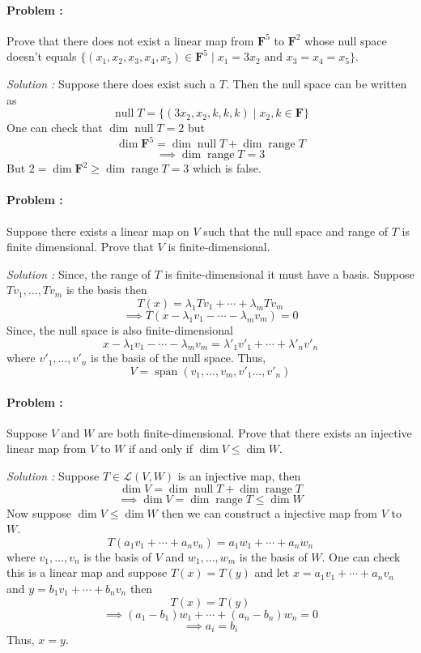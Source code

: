 \paragraph{Problem :} Prove that there does not exist a linear map from $\mathbf{F}^5$ to $\mathbf{F}^2$ whose null space doesn't 
equals $\{ (x_1, x_2, x_3, x_4, x_5) \in \mathbf{F}^5 \mid x_1 = 3x_2 \text{ and } x_3 = x_4 = x_5 \}$.

\vspace{4mm}
\textit{Solution :} Suppose there does exist such a $T$. Then the null space can be written as
\[ \operatorname{null} T = \{ (3x_2,x_2,k,k,k) \mid x_2, k \in \mathbf{F}\} \]
One can check that $\dim \operatorname{null} T = 2$ but 
\[ \dim \mathbf{F}^5 = \dim \operatorname{null} T + \dim \operatorname{range} T \]
\[ \implies \dim \operatorname{range} T = 3 \]
But $2=\dim \mathbf{F}^2 \ge \dim \operatorname{range} T = 3 $ which is false.


\paragraph{Problem :} Suppose there exists a linear map on $V$ such that the null space and range of $T$ is finite dimensional. Prove that
$V$ is finite-dimensional.

\vspace{4mm}
\textit{Solution :} Since, the range of $T$ is finite-dimensional it must have a basis. Suppose $Tv_1, \ldots, T v_m$ is the basis then
\[ T(x) = \lambda_1 Tv_1 + \cdots + \lambda_m Tv_m  \]
\[ \implies T(x-\lambda_1 v_1 - \cdots - \lambda_m v_m ) = 0 \]
Since, the null space is also finite-dimensional 
\[ x-\lambda_1 v_1 - \cdots - \lambda_m v_m = \lambda'_1 v'_1 + \cdots + \lambda'_n v'_n\]
where $v'_1,\ldots,v'_n$ is the basis of the null space. Thus,
\[ V = \operatorname{span}(v_1, \ldots, v_m, v'_1 \ldots, v'_n) \]

\paragraph{Problem :} Suppose $V$ and $W$ are both finite-dimensional. Prove that there exists an injective linear map from $V$ to $W$ 
if and only if $\dim V \le \dim W$.

\vspace{4mm}
\textit{Solution :} Suppose $T \in \mathcal{L}(V,W)$ is an injective map, then 
\[ \dim V = \dim \operatorname{null} T + \dim \operatorname{range} T  \]
\[ \implies \dim V = \dim \operatorname{range} T \le \dim W  \]
Now suppose $\dim V \le \dim W$ then we can construct a injective map from $V$ to $W$. 
\[ T(a_1 v_1 + \cdots + a_n v_n) = a_1 w_1 + \cdots + a_n w_n \]
where $v_1, \ldots, v_n$ is the basis of $V$ and $w_1, \ldots, w_m$ is the basis of $W$.
One can check this is a linear map and suppose $T(x)=T(y)$ and let $x=a_1 v_1 + \cdots + a_n v_n$ and $y=b_1 v_1 + \cdots + b_n v_n$ then
\[ T(x)=T(y) \]
\[ \implies (a_1-b_1)w_1 + \cdots + (a_n-b_n)w_n = 0 \]
\[ \implies a_i = b_i \]
Thus, $x=y$.

